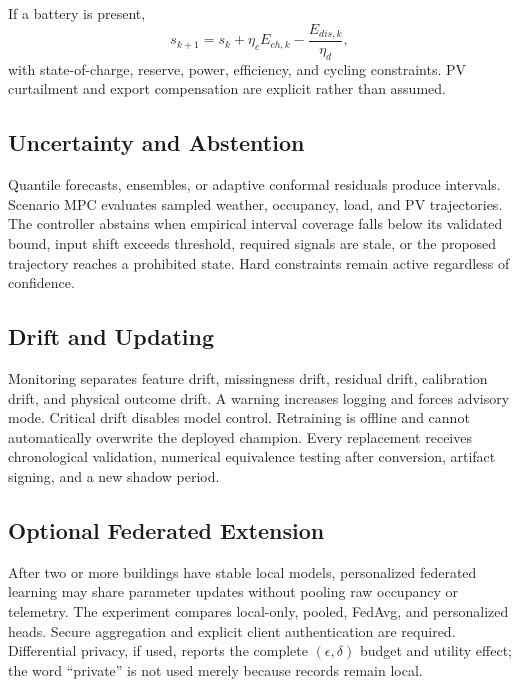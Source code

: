 If a battery is present,
\begin{equation}
	s_{k+1}=s_k+\eta_cE_{ch,k}-\frac{E_{dis,k}}{\eta_d},
\end{equation}
with state-of-charge, reserve, power, efficiency, and cycling constraints. PV curtailment and export compensation are explicit rather than assumed.

\subsection{Uncertainty and Abstention}

Quantile forecasts, ensembles, or adaptive conformal residuals produce intervals. Scenario MPC evaluates sampled weather, occupancy, load, and PV trajectories. The controller abstains when empirical interval coverage falls below its validated bound, input shift exceeds threshold, required signals are stale, or the proposed trajectory reaches a prohibited state. Hard constraints remain active regardless of confidence.

\subsection{Drift and Updating}

Monitoring separates feature drift, missingness drift, residual drift, calibration drift, and physical outcome drift. A warning increases logging and forces advisory mode. Critical drift disables model control. Retraining is offline and cannot automatically overwrite the deployed champion. Every replacement receives chronological validation, numerical equivalence testing after conversion, artifact signing, and a new shadow period.

\subsection{Optional Federated Extension}

After two or more buildings have stable local models, personalized federated learning may share parameter updates without pooling raw occupancy or telemetry. The experiment compares local-only, pooled, FedAvg, and personalized heads. Secure aggregation and explicit client authentication are required. Differential privacy, if used, reports the complete $(\epsilon,\delta)$ budget and utility effect; the word ``private'' is not used merely because records remain local.
